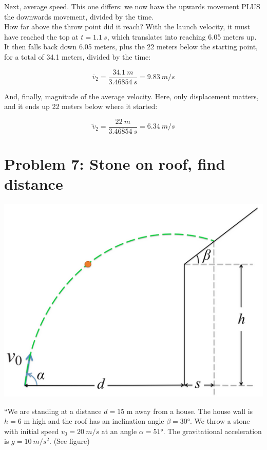 \documentclass[8.01x]{subfiles}
\begin{document}
Next, average speed. This one differs: we now have the upwards movement PLUS the downwards movement, divided by the time.\\
How far above the throw point did it reach? With the launch velocity, it must have reached the top at $t = \SI{1.1}{s}$, which translates into reaching 6.05 meters up. It then falls back down 6.05 meters, plus the 22 meters below the starting point, for a total of 34.1 meters, divided by the time:

\begin{equation}
\overbar{v}_2 = \frac{\SI{34.1}{m}}{\SI{3.46854}{s}} = \SI{9.83}{m/s}
\end{equation}

And, finally, magnitude of the average velocity. Here, only displacement matters, and it ends up 22 meters below where it started:

\begin{equation}
\widetilde{v}_2 = \frac{\SI{22}{m}}{\SI{3.46854}{s}} = \SI{6.34}{m/s}
\end{equation}

\section{Problem 7: Stone on roof, find distance}

\begin{center}
\includegraphics[scale=0.6]{Graphics/midterm1p7}
\end{center}

``We are standing at a distance $d = 15$ m away from a house. The house wall is $h = 6$ m high and the roof has an inclination angle $\beta = \ang{30}$. We throw a stone with initial speed $v_0 = \SI{20}{m/s}$ at an angle $\alpha = \ang{51}$. The gravitational acceleration is $g  =\SI{10}{m/s^2}$. (See figure)
\end{document}
